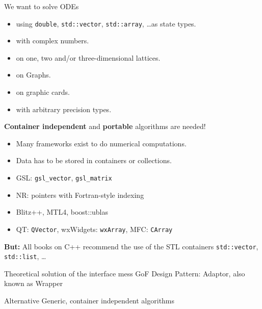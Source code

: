 \begin{frame}[fragile]

 \vspace{2ex}

 We want to solve ODEs
 \begin{itemize}
  \item using  {\tt double}, {\tt std::vector}, {\tt std::array}, \dots as state types.
  \item with complex numbers.
  \item on one, two and/or three-dimensional lattices.
  \item on Graphs.
  \item on graphic cards.
  \item with arbitrary precision types.
 \end{itemize}

 \vspace{4ex}
 \centerline{{\bf Container independent} and {\bf portable} algorithms are needed!}

\end{frame}





\begin{frame}

  \vspace{2ex}
  
    \begin{itemize}
      \item Many frameworks exist to do numerical computations.
      \item Data has to be stored in containers or collections.
      \item GSL: {\tt gsl\_vector}, {\tt gsl\_matrix}
      \item NR: pointers with Fortran-style indexing
      \item Blitz++, MTL4, boost::ublas
      \item QT: {\tt QVector}, wxWidgets: {\tt wxArray}, MFC: {\tt CArray}
    \end{itemize}


    {\bf \color{red} But:} All books on C++ recommend the use of the STL containers {\tt std::vector},
    {\tt std::list}, \dots

 \pause


  \begin{block}{Theoretical solution of the interface mess}
  GoF Design Pattern: Adaptor, also known as Wrapper
  \end{block}

  \pause

  \begin{exampleblock}{Alternative}
   Generic, container independent algorithms
  \end{exampleblock}

\end{frame}



